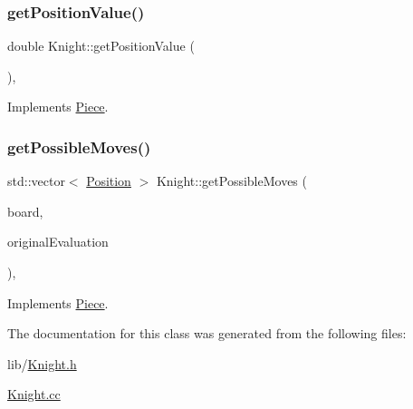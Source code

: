 \subsubsection{\texorpdfstring{get\+Position\+Value()}{getPositionValue()}}
{\footnotesize\ttfamily double Knight\+::get\+Position\+Value (\begin{DoxyParamCaption}{ }\end{DoxyParamCaption})\hspace{0.3cm}{\ttfamily [override]}, {\ttfamily [virtual]}}



Implements \hyperlink{class_piece_a4adfa58b4f0368c9a5859afcf294e0a4}{Piece}.

\mbox{\label{class_knight_a65f4e2cdeafefd7e4a7d3c9bca051a5a}} 
\subsubsection{\texorpdfstring{get\+Possible\+Moves()}{getPossibleMoves()}}
{\footnotesize\ttfamily std\+::vector$<$ \hyperlink{struct_position}{Position} $>$ Knight\+::get\+Possible\+Moves (\begin{DoxyParamCaption}\item[{std\+::shared\+\_\+ptr$<$ \hyperlink{class_base_board}{Base\+Board} $>$}]{board,  }\item[{bool}]{original\+Evaluation }\end{DoxyParamCaption})\hspace{0.3cm}{\ttfamily [override]}, {\ttfamily [virtual]}}



Implements \hyperlink{class_piece_a8891924c280568529878549f59541925}{Piece}.



The documentation for this class was generated from the following files\+:\begin{DoxyCompactItemize}
\item 
lib/\hyperlink{_knight_8h}{Knight.\+h}\item 
\hyperlink{_knight_8cc}{Knight.\+cc}\end{DoxyCompactItemize}
